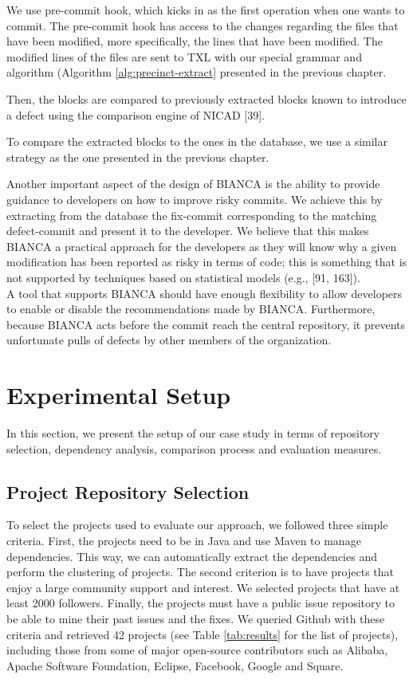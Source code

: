 \documentclass[12pt]{report}
\begin{document}
We use pre-commit hook, which kicks in as the first operation when one
wants to commit. The pre-commit hook has access to the changes regarding
the files that have been modified, more specifically, the lines that
have been modified. The modified lines of the files are sent to TXL with
our special grammar and algorithm (Algorithm \ref{alg:precinct-extract}
presented in the previous chapter.

Then, the blocks are compared to previously extracted blocks known to
introduce a defect using the comparison engine of NICAD {[}39{]}.

To compare the extracted blocks to the ones in the database, we use a
similar strategy as the one presented in the previous chapter.

Another important aspect of the design of BIANCA is the ability to
provide guidance to developers on how to improve risky commits. We
achieve this by extracting from the database the fix-commit
corresponding to the matching defect-commit and present it to the
developer. We believe that this makes BIANCA a practical approach for
the developers as they will know why a given modification has been
reported as risky in terms of code; this is something that is not
supported by techniques based on statistical models (e.g., {[}91,
163{]}).\\
A tool that supports BIANCA should have enough flexibility to allow
developers to enable or disable the recommendations made by BIANCA.
Furthermore, because BIANCA acts before the commit reach the central
repository, it prevents unfortunate pulls of defects by other members of
the organization.

\section{Experimental Setup}\label{experimental-setup-2}

In this section, we present the setup of our case study in terms of
repository selection, dependency analysis, comparison process and
evaluation measures.

\subsection{Project Repository Selection}\label{sec:rep}

To select the projects used to evaluate our approach, we followed three
simple criteria. First, the projects need to be in Java and use Maven to
manage dependencies. This way, we can automatically extract the
dependencies and perform the clustering of projects. The second
criterion is to have projects that enjoy a large community support and
interest. We selected projects that have at least 2000 followers.
Finally, the projects must have a public issue repository to be able to
mine their past issues and the fixes. We queried Github with these
criteria and retrieved 42 projects (see Table \ref{tab:results} for the
list of projects), including those from some of major open-source
contributors such as Alibaba, Apache Software Foundation, Eclipse,
Facebook, Google and Square.
\end{document}

